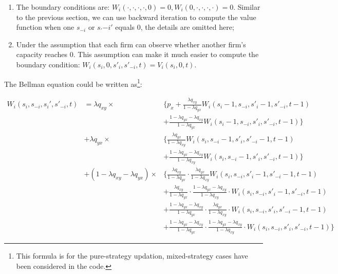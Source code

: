 \documentclass[12pt,letterpaper]{article}
\begin{document}
\begin{enumerate}
\begin{itemize}
\begin{itemize}
                \item with probability $\frac{\lambda q_{xy}}{1-\lambda q_{yx}} \cdot \frac{1-\lambda q_{yx}-\lambda q_{xy}}{1-\lambda q_{xy}}$, the state is transitioned to $(s_i,s_{-i},s'_i-1,s'_{-i},t-1)$;
                \item with probability $\frac{1-\lambda q_{yx}-\lambda q_{xy}}{1-\lambda q_{yx}} \cdot \frac{\lambda q_{yx}}{1-\lambda q_{xy}}$, the state is transitioned to $(s_i,s_{-i},s'_i,s'_{-i}-1,t-1)$;
                \item with probability $\frac{1-\lambda q_{yx}-\lambda q_{xy}}{1-\lambda q_{yx}} \cdot \frac{1-\lambda q_{yx}-\lambda q_{xy}}{1-\lambda q_{xy}}$, the state is transitioned to $(s_i,s_{-i},s'_i,s'_{-i},t-1)$.
            \end{itemize}
    \end{itemize}
    \item The boundary conditions are: $W_i(\cdot,\cdot,\cdot,\cdot,0)=0, W_i(0,\cdot,\cdot,\cdot,\cdot)=0$. Similar to the previous section, we can use backward iteration to compute the value function when one $s_{-i}$ or $s_'{-i}'$ equals $0$, the details are omitted here;
    \item Under the assumption that each firm can observe whether another firm's capacity reaches $0$. This assumption can make it much easier to compute the boundary condition: $W_i(s_i,0,s'_i,s'_{-i},t)=V_i(s_i,0,t)$.
\end{enumerate}

The Bellman equation could be written as\footnote{This formula is for the pure-strategy updation, mixed-strategy cases have been considered in the code.}:

\begin{align*}
    W_i(s_i,s_{-i},s_{i}',s'_{-i},t) &= \lambda q_{xy} \times & \{p_x + \frac{\lambda q_{xy}}{1-\lambda q_{yx}} W_i(s_i-1,s_{-i},s'_i-1,s'_{-i},t-1) \\
    && + \frac{1-\lambda q_{yx}-\lambda q_{xy}}{1-\lambda q_{yx}} W_i(s_i-1,s_{-i},s'_i,s'_{-i},t-1) \} \\
    & + \lambda q_{yx} \times & \{\frac{\lambda q_{yx}}{1-\lambda q_{xy}} W_i(s_i,s_{-i}-1,s'_i,s'_{-i}-1,t-1) \\
    && + \frac{1-\lambda q_{yx}-\lambda q_{xy}}{1-\lambda q_{xy}} W_i(s_i,s_{-i}-1,s'_i,s'_{-i},t-1) \} \\
    & + (1-\lambda q_{xy} - \lambda q_{yx}) \times & \{ \frac{\lambda q_{xy}}{1-\lambda q_{yx}} \cdot \frac{\lambda q_{yx}}{1-\lambda q_{xy}} W_i(s_i,s_{-i},s'_i-1,s'_{-i}-1,t-1)  \\
    && +\frac{\lambda q_{xy}}{1-\lambda q_{yx}} \cdot \frac{1-\lambda q_{yx}-\lambda q_{xy}}{1-\lambda q_{xy}} \cdot W_i(s_i,s_{-i},s'_i-1,s'_{-i},t-1) \\
    && + \frac{1-\lambda q_{yx}-\lambda q_{xy}}{1-\lambda q_{yx}} \cdot \frac{\lambda q_{yx}}{1-\lambda q_{xy}} \cdot W_i(s_i,s_{-i},s'_i,s'_{-i}-1,t-1) \\
    && + \frac{1-\lambda q_{yx}-\lambda q_{xy}}{1-\lambda q_{yx}} \cdot \frac{1-\lambda q_{yx}-\lambda q_{xy}}{1-\lambda q_{xy}} \cdot W_i(s_i,s_{-i},s'_i,s'_{-i},t-1) \}
\end{align*}
\end{document}
